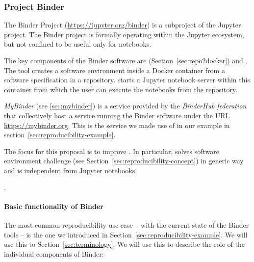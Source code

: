 \subsubsection{Project Binder}\label{seq:project-binder}

The Binder Project \cite{binder} (\url{https://jupyter.org/binder}) is
a subproject of the Jupyter project. The Binder project is formally operating
within the Jupyter ecosystem, but not confined to be useful only for notebooks.

The key components of the Binder software are \repotodocker{}
(Section~\ref{sec:repo2docker}) and \binderhub{}. The \repotodocker{} tool
creates a software environment inside a Docker container from a software
specification in a repository. \binderhub{} starts a Jupyter notebook server
within this container from which the user can execute the notebooks from the
repository.

\emph{MyBinder} (see \ref{sec:mybinder}) is a service provided by the \emph{BinderHub
  federation} that collectively host a service running the Binder software
under the URL \url{https://mybinder.org}. This is the service we made use of in
our example in section~\ref{sec:reproducibility-example}.

The focus for this proposal is to improve \repotodocker{}. In particular,
\repotodocker{} solves software environment challenge (see
Section~\ref{sec:reproducibility-concept}) in generic way and is independent
from Jupyter notebooks.

.

\paragraph{Basic functionality of Binder}
\label{binder-how-does-it-work}

The most common reproducibility use case -- with the current state of the Binder
tools -- is the one we introduced in
Section~\ref{sec:reproducibility-example}. We will use this to
Section~\ref{sec:terminology}. We will use this to
describe the role of the individual components of Binder:


